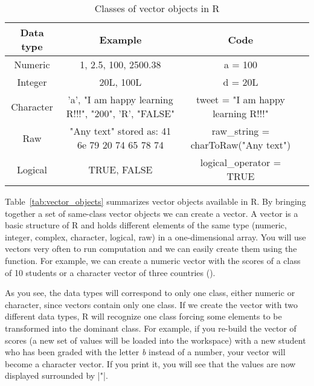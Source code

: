 \begin{table}[ht]
\label{tab:vector_objects}
\caption{Classes of vector objects in R\label{table:nonlin}}{%
\centering
\begin{tabular}{c c c p{2cm}}
\hline\hline
Data type & Example & Code \\ [0.5ex]
\hline
Numeric&1, 2.5, 100, 2500.38& a = 100 \\
Integer&20L, 100L&d = 20L \\
Character&   \parbox[t]{4cm}{\centering 'a', "I am happy learning R!!!", "200", 'R', "FALSE"} & tweet  = "I am happy learning R!!!" \\
Raw& \parbox[t]{4cm}{\centering "Any text" stored as:  41 6e 79 20 74 65 78 74} & raw\_string  = charToRaw("Any text") \\
Logical& TRUE, FALSE & logical\_operator  = TRUE  \\ [1ex]
\hline
\end{tabular}}{}
\end{table}


Table~\ref{tab:vector_objects} summarizes vector objects available in
R. By bringing together a set of same-class vector objects we can
create a vector. A vector is a basic structure of R and holds
different elements of the same type (numeric, integer, complex,
character, logical, raw) in a one-dimensional array. You will use
vectors very often to run computation and we can easily create them
using the  function. For example, we can create a numeric vector
with the scores of a class of 10 students or a character vector of
three countries ().


As you see, the data types will correspond to only one class, either
numeric or character, since vectors contain only one class. If we
create the vector with two different data types, R will recognize one
class forcing some elements to be transformed into the dominant
class. For example, if you re-build the vector of scores (a new set of
values will be loaded into the workspace) with a new student who has
been graded with the letter \emph{b} instead of a number, your vector
will become a character vector. If you print it, you will see that the
values are now displayed surrounded by |"|.


